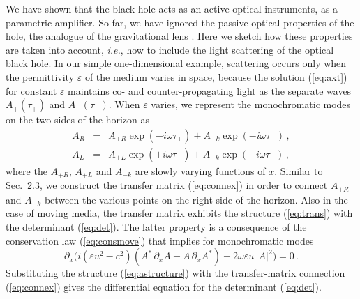 \documentclass[12pt,amsmath,amssymb]{article}
\numberwithin{equation}{section}
\begin{document}
We have shown that the black hole acts as an active optical
instruments, as a parametric amplifier.
So far, we have ignored the passive optical properties of the hole,
the analogue of the gravitational lens \cite{Schneider}.
Here we sketch how these properties are taken into account,
{\it i.e.}, how to include
the light scattering of the optical black hole.
In our simple one-dimensional example, scattering occurs only
when the permittivity $\varepsilon$ of the medium varies
in space, because the solution (\ref{eq:axt}) for constant
$\varepsilon$ maintains co- and counter-propagating light
as the separate waves $A_+(\tau_+)$ and $A_-(\tau_-)$.
When $\varepsilon$ varies, we represent the monochromatic
modes on the two sides of the horizon as
\begin{eqnarray}
A_R & = & A_{+R} \exp({-i\omega\tau_+}) +
A_{-k} \exp({-i\omega\tau_-}) \,,
\nonumber\\
A_L & = & A_{+L} \exp({+i\omega\tau_+}) +
A_{-k} \exp({-i\omega\tau_-}) \,,
\label{eq:astructure}
\end{eqnarray}
where the $A_{+R}$,  $A_{+L}$ and $A_{-k}$ are slowly varying
functions of $x$.
Similar to Sec.\ 2.3, we construct
the transfer matrix (\ref{eq:connex}) in order to connect
$A_{+R}$ and $A_{-k}$ between the various points
on the right side of the horizon.
Also in the case of moving media,
the transfer matrix exhibits the structure (\ref{eq:trans})
with the determinant (\ref{eq:det}).
The latter property is a consequence
of the conservation law (\ref{eq:consmove}) that implies
for monochromatic modes
\begin{equation}
\partial_x \Big(i(\varepsilon u^2 - c^2)
(A^*\,\partial_x A - A\,\partial_x A^*) +
2\omega\varepsilon u \,|A|^2 \Big) = 0 \,.
\end{equation}
Substituting the structure (\ref{eq:astructure})
with the transfer-matrix connection (\ref{eq:connex})
gives the differential equation for the determinant (\ref{eq:det}).
\end{document}
